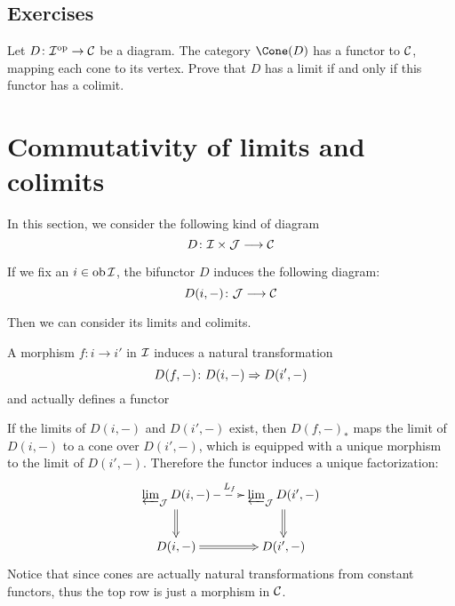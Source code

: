 \subsection{Exercises}
  \begin{ex}
    Let $D\colon{\cal I}^{\operatorname{op}}\to{\cal C}$ be a diagram. The category $\Cone(D)$ has a functor to ${\cal C}$, mapping each cone to its vertex. Prove that $D$ has a limit if and only if this functor has a colimit.
  \end{ex}

\newpage\section{Commutativity of limits and colimits}
  In this section, we consider the following kind of diagram
  \begin{equation*}
    D\colon{\cal I}\times{\cal J}\longrightarrow{\cal C}
  \end{equation*}

  If we fix an $i\in\operatorname{ob}{\cal I}$, the bifunctor $D$ induces the following diagram:
  \begin{equation*}
    D(i,-)\colon{\cal J}\longrightarrow{\cal C}
  \end{equation*}

  Then we can consider its limits and colimits.

  A morphism $f\colon i\to i'$ in ${\cal I}$ induces a natural transformation
  \begin{equation*}
    D(f,-)\colon D(i,-)\Rightarrow D(i',-)
  \end{equation*}
  and actually defines a functor

  If the limits of $D(i,-)$ and $D(i',-)$ exist, then $D(f,-)_{\ast}$ maps the limit of $D(i,-)$ to a cone over $D(i',-)$, which is equipped with a unique morphism to the limit of $D(i',-)$. Therefore the functor induces a unique factorization:
  \begin{displaymath}
    \xymatrix{
      {\invlim_{\Jj} D(i,-)}\ar@{=>}[d] \ar@{-->}[r]^{L_f} & {\invlim_{\Jj} D(i',-)}\ar@{=>}[d] \\
      D(i,-)\ar@{=>}[r] & D(i',-)
    }
  \end{displaymath}
  Notice that since cones are actually natural transformations from constant functors, thus the top row is just a morphism in ${\cal C}$.

